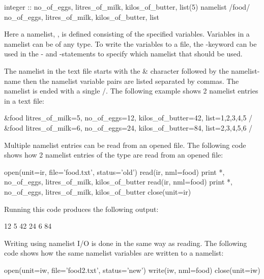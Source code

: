 \begin{fortrancodeenv}
integer :: no_of_eggs, litres_of_milk, kilos_of_butter, list(5)
namelist /food/ no_of_eggs, litres_of_milk, kilos_of_butter, list
\end{fortrancodeenv}

Here a namelist, , is defined consisting of the specified variables. Variables in a namelist can be of any type. To write the variables to a file, the -keyword can be used in the - and -statements to specify which namelist that should be used. 

The namelist in the text file starts with the \& character followed by the namelist-name then the namelist variable pairs are listed separated by commas. The namelist is ended with a single /. The following example shows 2 namelist entries in a text file:

\begin{fortrancodeenv}
&food litres_of_milk=5, no_of_eggs=12, kilos_of_butter=42, list=1,2,3,4,5 /
&food litres_of_milk=6, no_of_eggs=24, kilos_of_butter=84, list=2,3,4,5,6 /
\end{fortrancodeenv}

Multiple namelist entries can be read from an opened file. The following code shows how 2 namelist entries of the type  are read from an opened file:

\begin{fortrancodeenv}
open(unit=ir, file='food.txt', status='old')
read(ir, nml=food)
print *, no_of_eggs, litres_of_milk, kilos_of_butter
read(ir, nml=food)
print *, no_of_eggs, litres_of_milk, kilos_of_butter
close(unit=ir)
\end{fortrancodeenv}

Running this code produces the following output:

\cmdmode

\begin{fortrancodeenv}
          12           5          42
          24           6          84
\end{fortrancodeenv}

\fmode

Writing using namelist I/O is done in the same way as reading. The following code shows how the same namelist variables are written to a namelist:

\begin{fortrancodeenv}
open(unit=iw, file='food2.txt', status='new')
write(iw, nml=food)
close(unit=iw)
\end{fortrancodeenv}

